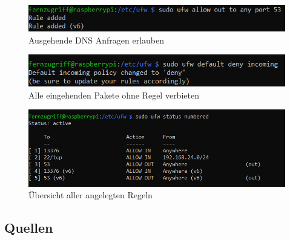 \documentclass[a4paper, 11pt]{scrartcl}
\begin{document}
\begin{figure}[H]
    \begin{center}
        \includegraphics[scale=0.7]{Bilder/ufw_allow_out_dns.png}
        \caption{Ausgehende DNS Anfragen erlauben}\label{pic:dns_allow_out}
    \end{center}
\end{figure}

\begin{figure}[H]
    \begin{center}
        \includegraphics[scale=0.7]{Bilder/ufw_deny_all_incoming.png}
        \caption{Alle eingehenden Pakete ohne Regel verbieten}\label{pic:firewall_deny_default}
    \end{center}
\end{figure}

\begin{figure}[H]
    \begin{center}
        \includegraphics[scale=0.7]{Bilder/ufw_status_all_rules.png}
        \caption{Übersicht aller angelegten Regeln}\label{pic:firewall_status}
    \end{center}
\end{figure}





\subsection{Quellen}
\begin{small}

\end{small}
\end{document}
